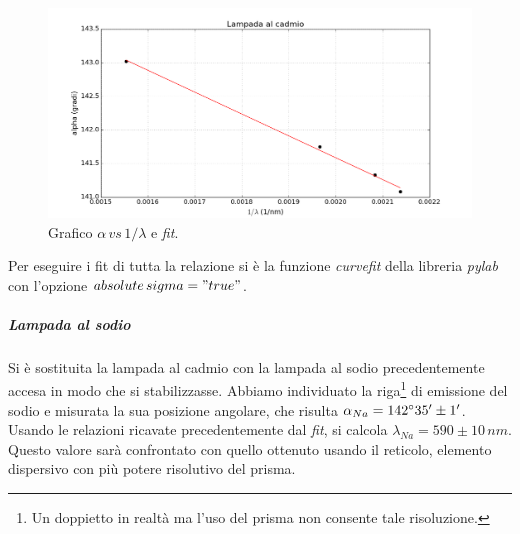 \documentclass[10pt,a4paper]{article}
\begin{document}
\begin{figure}[!htb]
  \centering
  \includegraphics[scale=0.6]{imm.png}
\caption{Grafico $\alpha\, \textit{vs}\, 1/\lambda$ e \emph{fit}.}
\label{calibrazione}
\end{figure}

Per eseguire i fit di tutta la relazione si è la funzione \emph{curvefit} della libreria \emph{pylab} con l'opzione \emph{$absolute\,sigma = "true"$}.\\

\subparagraph{Lampada al sodio}
Si è sostituita la lampada al cadmio con la lampada al sodio precedentemente accesa in modo che si stabilizzasse. Abbiamo individuato la riga\footnote{Un doppietto in realtà ma l'uso del prisma non consente tale risoluzione.} di emissione del sodio e misurata la sua posizione angolare, che risulta $\alpha_{Na}=142 \degree 35'\pm 1'$. Usando le relazioni ricavate precedentemente dal \emph{fit}, si calcola $\lambda_{Na}=590 \pm 10 \,nm$. Questo valore sarà confrontato con quello ottenuto usando il reticolo, elemento dispersivo con più potere risolutivo del prisma.
\end{document}

